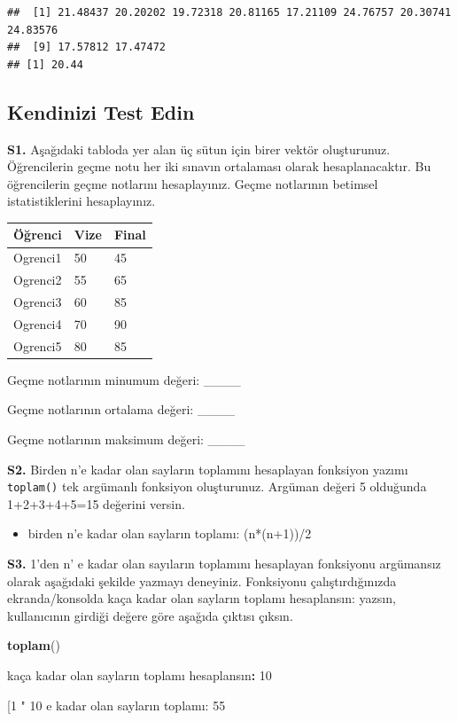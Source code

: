\documentclass[
  oneside]{book}
\newenvironment{Shaded}{\begin{snugshade}}{\end{snugshade}}
\newcommand{\DecValTok}[1]{\textcolor[rgb]{0.00,0.00,0.81}{#1}}
\newcommand{\FunctionTok}[1]{\textcolor[rgb]{0.13,0.29,0.53}{\textbf{#1}}}
\newcommand{\NormalTok}[1]{#1}
\newcommand{\SpecialCharTok}[1]{\textcolor[rgb]{0.81,0.36,0.00}{\textbf{#1}}}
\newcommand{\StringTok}[1]{\textcolor[rgb]{0.31,0.60,0.02}{#1}}
\providecommand{\tightlist}{%
  \setlength{\itemsep}{0pt}\setlength{\parskip}{0pt}}
\begin{document}
\begin{verbatim}
##  [1] 21.48437 20.20202 19.72318 20.81165 17.21109 24.76757 20.30741 24.83576
##  [9] 17.57812 17.47472
## [1] 20.44
\end{verbatim}

\hypertarget{kendinizi-test-edin}{%
\subsection{Kendinizi Test Edin}\label{kendinizi-test-edin}}

\textbf{S1.} Aşağıdaki tabloda yer alan üç sütun için birer vektör oluşturunuz. Öğrencilerin geçme notu her iki sınavın ortalaması olarak hesaplanacaktır. Bu öğrencilerin geçme notlarını hesaplayınız. Geçme notlarının betimsel istatistiklerini hesaplayınız.

\begin{longtable}[]{@{}lll@{}}
\toprule\noalign{}
Öğrenci & Vize & Final \\
\midrule\noalign{}
\endhead
\bottomrule\noalign{}
\endlastfoot
Ogrenci1 & 50 & 45 \\
Ogrenci2 & 55 & 65 \\
Ogrenci3 & 60 & 85 \\
Ogrenci4 & 70 & 90 \\
Ogrenci5 & 80 & 85 \\
\end{longtable}

Geçme notlarının minumum değeri: \_\_\_\_

Geçme notlarının ortalama değeri: \_\_\_\_

Geçme notlarının maksimum değeri: \_\_\_\_

\textbf{S2.} Birden n'e kadar olan sayların toplamını hesaplayan fonksiyon yazımı \texttt{toplam()} tek argümanlı fonksiyon oluşturunuz. Argüman değeri 5 olduğunda 1+2+3+4+5=15 değerini versin.

\begin{itemize}
\tightlist
\item
  birden n'e kadar olan sayların toplamı: (n*(n+1))/2
\end{itemize}

\textbf{S3.} 1'den n' e kadar olan sayıların toplamını hesaplayan fonksiyonu argümansız olarak aşağıdaki şekilde yazmayı deneyiniz. Fonksiyonu çalıştırdığınızda ekranda/konsolda kaça kadar olan sayların toplamı hesaplansın: yazsın, kullanıcının girdiği değere göre aşağıda çıktısı çıksın.

\begin{Shaded}
\begin{Highlighting}[]
\FunctionTok{toplam}\NormalTok{()}

\NormalTok{kaça kadar olan sayların toplamı hesaplansın}\SpecialCharTok{:} \DecValTok{10}

\NormalTok{[}\DecValTok{1} \StringTok{" 10 \textquotesingle{}e kadar olan sayların toplamı: 55}
\end{Highlighting}
\end{Shaded}
\end{document}

